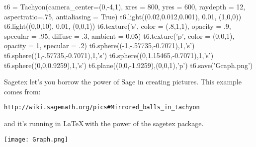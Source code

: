 \documentclass{article}
\begin{document}
\begin{sagesilent}
t6 = Tachyon(camera_center=(0,-4,1), xres = 800, yres = 600, raydepth = 12, aspectratio=.75, antialiasing = True)
t6.light((0.02,0.012,0.001), 0.01, (1,0,0))
t6.light((0,0,10), 0.01, (0,0,1))
t6.texture('s', color = (.8,1,1), opacity = .9, specular = .95, diffuse = .3, ambient = 0.05)
t6.texture('p', color = (0,0,1), opacity = 1, specular = .2)
t6.sphere((-1,-.57735,-0.7071),1,'s')
t6.sphere((1,-.57735,-0.7071),1,'s')
t6.sphere((0,1.15465,-0.7071),1,'s')
t6.sphere((0,0,0.9259),1,'s')
t6.plane((0,0,-1.9259),(0,0,1),'p')
t6.save('Graph.png')
\end{sagesilent}
Sagetex let's you borrow the power of Sage in creating pictures. This
example comes from:
\begin{verbatim}
http://wiki.sagemath.org/pics#Mirrored_balls_in_tachyon
\end{verbatim}
and it's running in \LaTeX \,with the power of the sagetex package.
\begin{center}
\texttt{[image: Graph.png]}
\end{center}
\end{document}
